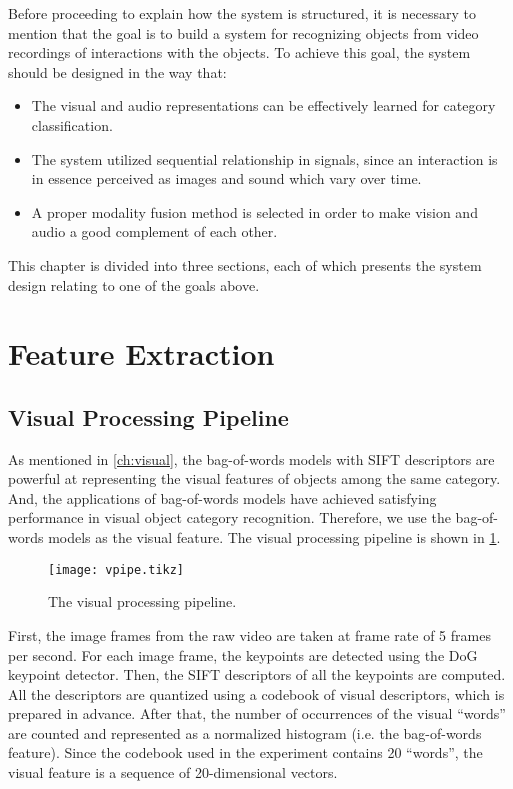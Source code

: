 \documentclass[12pt,final,twoside]{report}
\begin{document}
Before proceeding to explain how the system is structured, it is necessary to mention that the goal is to build a system for recognizing objects from video recordings of interactions with the objects. To achieve this goal, the system should be designed in the way that:
\begin{itemize}
  \item The visual and audio representations can be effectively learned for category classification.
  \item The system utilized sequential relationship in signals, since an interaction is in essence perceived as images and sound which vary over time.
  \item A proper modality fusion method is selected in order to make vision and audio a good complement of each other.
\end{itemize}

This chapter is divided into three sections, each of which presents the system design relating to one of the goals above.

\section{Feature Extraction}
\subsection{Visual Processing Pipeline}
As mentioned in \cref{ch:visual}, the bag-of-words models with SIFT descriptors are powerful at representing the visual features of objects among the same category. And, the applications of bag-of-words models have achieved satisfying performance in visual object category recognition. Therefore, we use the bag-of-words models as the visual feature. The visual processing pipeline is shown in \cref{fig:vpipe}. 

\begin{figure}[t]
  \centering
  \texttt{[image: vpipe.tikz]}
  \caption{The visual processing pipeline.}
  \label{fig:vpipe}
\end{figure}

First, the image frames from the raw video are taken at frame rate of 5 frames per second. For each image frame, the keypoints are detected using the DoG keypoint detector. Then, the SIFT descriptors of all the keypoints are computed. All the descriptors are quantized using a codebook of visual descriptors, which is prepared in advance. After that, the number of occurrences of the visual ``words'' are counted and represented as a normalized histogram (i.e. the bag-of-words feature). Since the codebook used in the experiment contains 20 ``words'', the visual feature is a sequence of 20-dimensional vectors.
\end{document}
